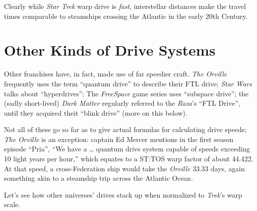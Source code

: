 \documentclass[
  letterpaper,
]{book}
\begin{document}
Clearly while \emph{Star Trek} warp drive is \emph{fast}, interstellar
distances make the travel times comparable to steamships crossing the
Atlantic in the early 20th Century.

\chapter{Other Kinds of Drive
Systems}\label{other-kinds-of-drive-systems}

Other franchises have, in fact, made use of far speedier craft.
\emph{The Orville} frequently uses the term ``quantum drive'' to
describe their FTL drive; \emph{Star Wars} talks about ``hyperdrives'';
The \emph{FreeSpace} game series uses ``subspace drive''; the (sadly
short-lived) \emph{Dark Matter} regularly referred to the \emph{Raza}'s
``FTL Drive'', until they acquired theit ``blink drive'' (more on this
below).

Not all of these go so far as to give actual formulas for calculating
drive speeds; \emph{The Orville} is an exception: captain Ed Mercer
mentions in the first season episode ``Pria'', ``We have a \ldots{}
quantum drive system capable of speeds exceeding 10 light years per
hour,'' which equates to a ST:TOS warp factor of about 44.422. At that
speed, a cross-Federation ship would take the \emph{Orville} 33.33 days,
again something akin to a steamship trip across the Atlantic Ocean.

Let's see how other universes' drives stack up when normalized to
\emph{Trek}'s warp scale.
\end{document}
